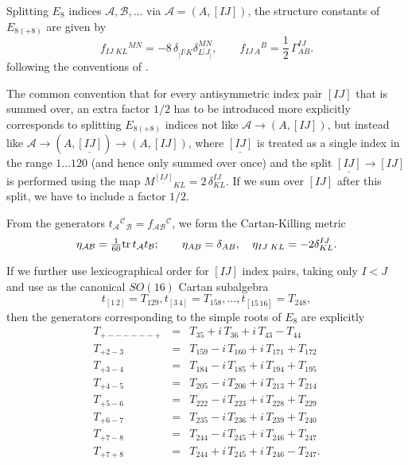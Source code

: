 \documentclass[a4paper,12pt]{article}
\begin{document}
Splitting $E_8$ indices $\mathcal{A}, \mathcal{B},\ldots$ via
$\mathcal{A}=(A,[IJ])$, the structure constants of $E_{8(+8)}$ are
given by
\begin{equation}
f_{IJ\;KL}{}^{MN}=-8\,\delta_{{}_[I{}^[K}^{\phantom{MN}}\delta_{L{}^]J{}_]}^{MN},\qquad
f_{IJ\,A}{}^{B}={\textstyle \frac{1}{2}}\,\Gamma^{IJ}_{AB}.
\end{equation}
following the conventions of \cite{Nicolai:2000sc, Nicolai:2001sv}.

The common convention that for every antisymmetric index pair $[IJ]$
that is summed over, an extra factor $1/2$ has to be
introduced more explicitly corresponds to splitting $E_{8(+8)}$
indices not like $\mathcal{A}\rightarrow(A,[IJ])$, but instead like
$\mathcal{A}\rightarrow(A,\underline{[IJ]})\rightarrow(A,[IJ])$, where
$\underline{[IJ]}$ is treated as a single index in the range
$1\ldots120$ (and hence only summed over once) and the split
$\underline{[IJ]}\rightarrow[IJ]$ is performed using the map
$M^{\underline{[IJ]}}{}_{KL}=2\,\delta^{IJ}_{KL}$. If we sum over
$[IJ]$ after this split, we have to include a factor $1/2$.

From the generators
$t_\mathcal{A}{}^{\mathcal{C}}{}_{\mathcal{B}}=f_{\mathcal{A}\mathcal{B}}{}^{\mathcal{C}}$,
we form the Cartan-Killing metric
\begin{equation}
\eta_{\mathcal{A}\mathcal{B}}={\textstyle \frac{1}{60}}\mbox{tr}\,t_\mathcal{A}t_\mathcal{B};\qquad\eta_{AB}=\delta_{AB},\quad\eta_{IJ\;KL}=-2\delta^{IJ}_{KL}.
\end{equation}

If we further use lexicographical order for $[IJ]$ index pairs,
taking only $I<J$ and use as the canonical $SO(16)$ Cartan subalgebra
\[t_{[1\,2]}=T_{129}, t_{[3\,4]}=T_{158},\ldots,t_{[15\,16]}=T_{248},\]
then the generators corresponding to the simple roots of $E_8$ are explicitly 
\begin{equation}
\begin{array}{lll}
T_{\scriptscriptstyle{+------+}}&=&T_{35}+i\,T_{36}+i\,T_{43}-T_{44}\\
T_{\scriptscriptstyle{+2-3}}&=&T_{159}-i\,T_{160}+i\,T_{171}+T_{172}\\
T_{\scriptscriptstyle{+3-4}}&=&T_{184}-i\,T_{185}+i\,T_{194}+T_{195}\\
T_{\scriptscriptstyle{+4-5}}&=&T_{205}-i\,T_{206}+i\,T_{213}+T_{214}\\
T_{\scriptscriptstyle{+5-6}}&=&T_{222}-i\,T_{223}+i\,T_{228}+T_{229}\\
T_{\scriptscriptstyle{+6-7}}&=&T_{235}-i\,T_{236}+i\,T_{239}+T_{240}\\
T_{\scriptscriptstyle{+7-8}}&=&T_{244}-i\,T_{245}+i\,T_{246}+T_{247}\\
T_{\scriptscriptstyle{+7+8}}&=&T_{244}+i\,T_{245}+i\,T_{246}-T_{247}.
\end{array}
\end{equation}
\end{document}
